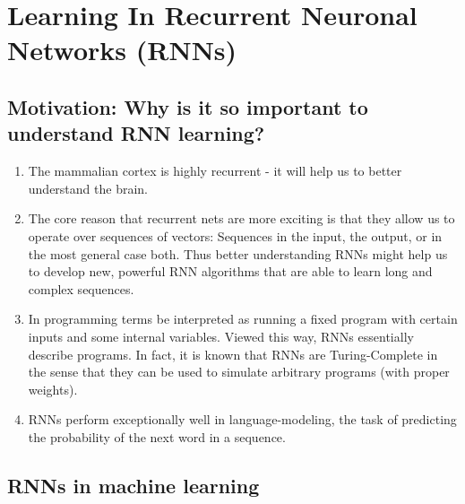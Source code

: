\documentclass[main]{subfiles}
\begin{document}
\newpage
\section{Learning In Recurrent Neuronal Networks (RNNs)}
\subsection{Motivation: Why is it so important to understand RNN learning?}
\begin{enumerate}
    \item The mammalian cortex is highly recurrent - it will help us to better understand the brain.
    \item The core reason that recurrent nets are more exciting is that they allow us to operate over sequences of vectors: Sequences in the input, the output, or in the most general case both. Thus better understanding RNNs might help us to develop new, powerful RNN algorithms that are able to learn long and complex sequences.
    \item In programming terms be interpreted as running a fixed program with certain inputs and some internal variables. Viewed this way, RNNs essentially describe programs. In fact, it is known that RNNs are Turing-Complete in the sense that they can be used to simulate arbitrary programs (with proper weights).
    \item RNNs perform exceptionally well in language-modeling, the task of predicting the probability of the next word in a sequence.
\end{enumerate}


\subsection{RNNs in machine learning}
\end{document}
